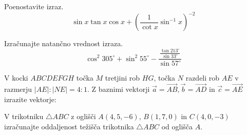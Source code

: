 \documentclass[addpoints]{exam}
\begin{document}
\begin{questions}


    \question[4]
    Poenostavite izraz. 
    $$ \sin x\tan x\cos x + \left(\dfrac{1}{\cot x}\sin^{-1}x\right)^{-2} $$

    \begin{solution}[6.5cm]
       
    \end{solution}



    \question[4]
    Izračunajte natančno vrednost izraza. 
    $$ \cos^2 305^\circ + \sin^2 55^\circ - \dfrac{\frac{\tan 213^\circ}{\sin 33^\circ}}{\sin 57^\circ} $$

    \begin{solution}[6cm]
       
    \end{solution}


\newpage

    \question
    V kocki $ABCDEFGH$ točka $M$ tretjini rob $HG$, točka $N$ razdeli rob $AE$ v razmerju $|AE|:|NE|=4:1$.
    Z baznimi vektorji $\overrightarrow{a}=\overrightarrow{AB}, \overrightarrow{b}=\overrightarrow{AD}$ in $\overrightarrow{c}=\overrightarrow{AE}$ izrazite vektorje: 

    \begin{solution}[5cm]

    \end{solution}

    

    

    \question[4]
    V trikotniku $\triangle ABC$ z oglišči $A(4,5,-6)$, $B(1,7,0)$ in $C(4,0,-3)$ izračunajte oddaljenost težišča trikotnika $\triangle ABC$ od oglišča $A$.


\end{questions}
\end{document}
